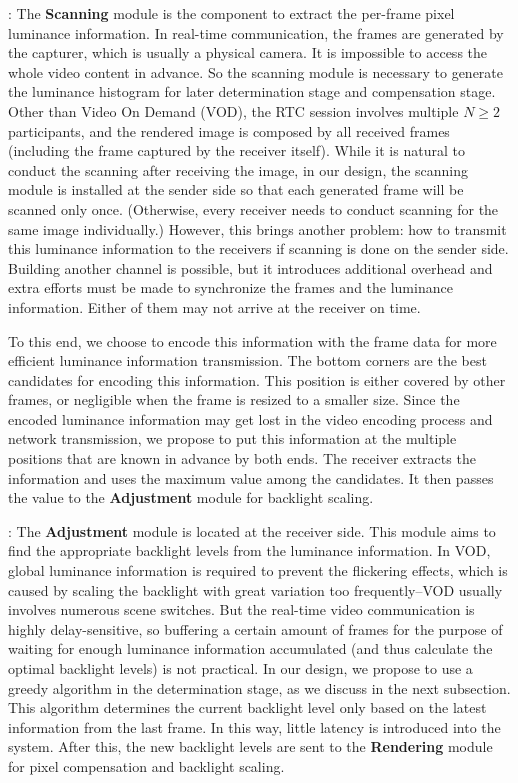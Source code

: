 :
The {\bf Scanning} module is the component to extract the per-frame pixel
luminance information. In real-time communication, the frames are
generated by the capturer, which is usually a physical camera. 
It is impossible to access the whole video content in advance. So the
scanning module is necessary to generate the luminance histogram for
later determination stage and compensation stage. Other than Video
On Demand (VOD), the RTC session involves multiple $N \ge 2$ participants, 
and the rendered image is composed by all received frames (including the frame captured by
the receiver itself). While it is natural to conduct the scanning
after receiving the image, in our design, the scanning module is
installed at the sender side so that each generated frame will be
scanned only once. (Otherwise, every receiver needs to conduct
scanning for the same image individually.)  However, this brings
another problem: how to transmit this luminance information to the
receivers if scanning is done on the sender side. Building another
channel is possible, but it introduces additional overhead and extra
efforts must be made to synchronize the frames and the luminance
information. Either of them may not arrive at the receiver on time.

To this end, we choose to encode this information with the frame data
for more efficient luminance information transmission. 
The bottom corners are the best candidates for encoding this information. 
This position is either covered by other frames, or negligible when the frame is
resized to a smaller size.  Since the encoded luminance information may get
lost in the video encoding process and network transmission, we propose to
put this information at the multiple positions that are known in advance 
by both ends. The receiver extracts the information and uses the maximum value
among the candidates. It then passes the value to the {\bf
  Adjustment} module for backlight scaling.

: 
The {\bf Adjustment} module is located at the receiver side. This
module aims to find the appropriate backlight levels from the
luminance information. In VOD, global luminance information is
required to prevent the flickering effects, which is caused by scaling
the backlight with great variation too frequently--VOD usually
involves numerous scene switches. But 
 the real-time video communication is highly delay-sensitive, so buffering a certain
amount of frames for the purpose of waiting for enough luminance
information accumulated (and thus calculate the optimal backlight levels) is not
practical. In our design, we propose to use a greedy algorithm in the
determination stage, as we discuss in the next subsection. This
algorithm determines the current backlight level
only based on the latest information from the last frame. In this way,
little latency is introduced into the system. After this,
the new backlight levels are sent to the {\bf Rendering} module for
pixel compensation and backlight scaling.

